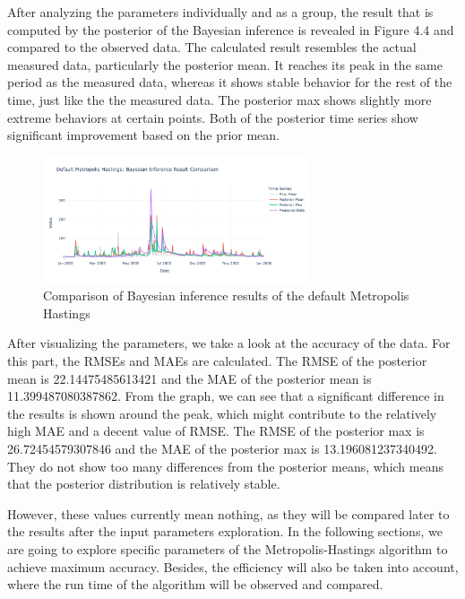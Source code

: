 After analyzing the parameters individually and as a group, the result that is computed by the posterior of the Bayesian inference is revealed in Figure 4.4 and compared to the observed data. The calculated result resembles the actual measured data, particularly the posterior mean. It reaches its peak in the same period as the measured data, whereas it shows stable behavior for the rest of the time, just like the the measured data. The posterior max shows slightly more extreme behaviors at certain points. Both of the posterior time series show significant improvement based on the prior mean. 


\begin{figure}[H]
    \centering
    \includegraphics[width=0.7\textwidth]{figures/basic_mh/default_mh/default_mh_bayes.png}
    \captionsetup{width=.8\textwidth}
    \caption{Comparison of Bayesian inference results of the default Metropolis Hastings}
    \label{fig:enter-label}
\end{figure}

After visualizing the parameters, we take a look at the accuracy of the data. For this part, the RMSEs and MAEs are calculated. The RMSE of the posterior mean is 22.14475485613421 and the MAE of the posterior mean is 11.399487080387862. From the graph, we can see that a significant difference in the results is shown around the peak, which might contribute to the relatively high MAE and a decent value of RMSE. The RMSE of the posterior max is 26.72454579307846 and the MAE of the posterior max is 13.196081237340492. They do not show too many differences from the posterior means, which means that the posterior distribution is relatively stable. 

However, these values currently mean nothing, as they will be compared later to the results after the input parameters exploration. In the following sections, we are going to explore specific parameters of the Metropolis-Hastings algorithm to achieve maximum accuracy. Besides, the efficiency will also be taken into account, where the run time of the algorithm will be observed and compared.


